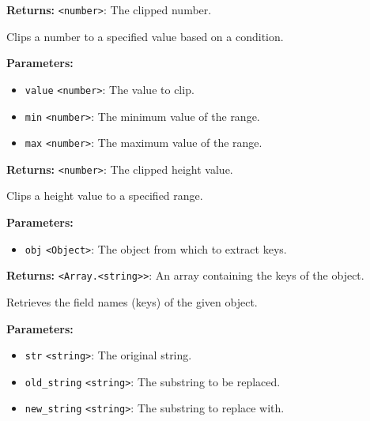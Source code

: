 \documentclass[12pt,a4paper]{article}
\begin{document}
\noindent \textbf{Returns:} \texttt{<number>}: The clipped number.

\noindent Clips a number to a specified value based on a condition.

\vspace{5mm}
\noindent {}


\noindent \textbf{Parameters:}
\begin{itemize}
  \item \texttt{value} \texttt{<number>}: The value to clip.
  \item \texttt{min} \texttt{<number>}: The minimum value of the range.
  \item \texttt{max} \texttt{<number>}: The maximum value of the range.
\end{itemize}

\noindent \textbf{Returns:} \texttt{<number>}: The clipped height value.

\noindent Clips a height value to a specified range.

\vspace{5mm}
\noindent {}


\noindent \textbf{Parameters:}
\begin{itemize}
  \item \texttt{obj} \texttt{<Object>}: The object from which to extract keys.
\end{itemize}

\noindent \textbf{Returns:} \texttt{<Array.<string>>}: An array containing the keys of the object.

\noindent Retrieves the field names (keys) of the given object.

\vspace{5mm}
\noindent {}


\noindent \textbf{Parameters:}
\begin{itemize}
  \item \texttt{str} \texttt{<string>}: The original string.
  \item \texttt{old\_string} \texttt{<string>}: The substring to be replaced.
  \item \texttt{new\_string} \texttt{<string>}: The substring to replace with.
\end{itemize}
\end{document}
